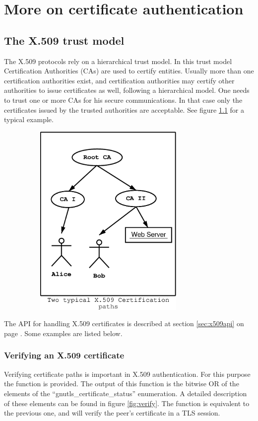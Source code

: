 \chapter{More on certificate authentication}
\label{certificate}

\section{The X.509 trust model}
\label{x509:trust}

The X.509 protocols rely on a hierarchical trust model. In this trust model
Certification Authorities (CAs) are used to certify entities.
Usually more than one certification authorities exist, and certification
authorities may certify other authorities to issue certificates as well,
following a hierarchical model. 
One needs to trust one or more CAs for his secure
communications. In that case only the certificates issued by the trusted
authorities are acceptable. See figure \ref{fig:x509-1} for a typical example.

\begin{figure}[hbtp]
\includegraphics[height=9.5cm,width=9cm]{x509-1}
\label{fig:x509-1}
\end{figure}


The API for handling X.509 certificates is described at section \ref{sec:x509api}
on page \pageref{sec:x509api}. Some examples are listed below.


\subsection{Verifying an X.509 certificate}
Verifying certificate paths is important 
in X.509 authentication. For this purpose the function
 is provided. The
output of this function is the bitwise OR of the elements of the
``gnutls\_certificate\_status'' enumeration. A detailed description of
these elements can be found in figure \ref{fig:verify}.
The function 
is equivalent to the previous one, and will verify the peer's certificate in a TLS session.

